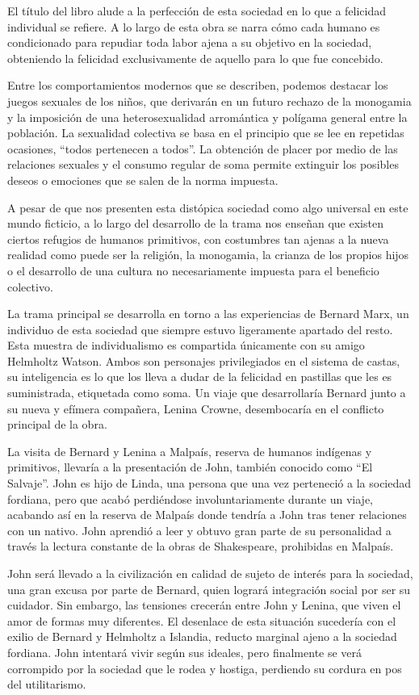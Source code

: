 \documentclass{article}
\begin{document}
El título del libro alude a la perfección de esta sociedad en lo que a felicidad individual se refiere. A lo largo de esta obra se narra cómo cada humano es condicionado para repudiar toda labor ajena a su objetivo en la sociedad, obteniendo la felicidad exclusivamente de aquello para lo que fue concebido.

Entre los comportamientos modernos que se describen, podemos destacar los juegos sexuales de los niños, que derivarán en un futuro rechazo de la monogamia y la imposición de una heterosexualidad arromántica y polígama general entre la población. La sexualidad colectiva se basa en el principio que se lee en repetidas ocasiones, ``todos pertenecen a todos''. La obtención de placer por medio de las relaciones sexuales y el consumo regular de soma permite extinguir los posibles deseos o emociones que se salen de la norma impuesta.

A pesar de que nos presenten esta distópica sociedad como algo universal en este mundo ficticio, a lo largo del desarrollo de la trama nos enseñan que existen ciertos refugios de humanos primitivos, con costumbres tan ajenas a la nueva realidad como puede ser la religión, la monogamia, la crianza de los propios hijos o el desarrollo de una cultura no necesariamente impuesta para el beneficio colectivo.

La trama principal se desarrolla en torno a las experiencias de Bernard Marx, un individuo de esta sociedad que siempre estuvo ligeramente apartado del resto. Esta muestra de individualismo es compartida únicamente con su amigo Helmholtz Watson. Ambos son personajes privilegiados en el sistema de castas, su inteligencia es lo que los lleva a dudar de la felicidad en pastillas que les es suministrada, etiquetada como soma. Un viaje que desarrollaría Bernard junto a su nueva y efímera compañera, Lenina Crowne, desembocaría en el conflicto principal de la obra.

La visita de Bernard y Lenina a Malpaís, reserva de humanos indígenas y primitivos, llevaría a la presentación de John, también conocido como ``El Salvaje''. John es hijo de Linda, una persona que una vez perteneció a la sociedad fordiana, pero que acabó perdiéndose involuntariamente durante un viaje, acabando así en la reserva de Malpaís donde tendría a John tras tener relaciones con un nativo. John aprendió a leer y obtuvo gran parte de su personalidad a través la lectura constante de la obras de Shakespeare, prohibidas en Malpaís.

John será llevado a la civilización en calidad de sujeto de interés para la sociedad, una gran excusa por parte de Bernard, quien logrará integración social por ser su cuidador. Sin embargo, las tensiones crecerán entre John y Lenina, que viven el amor de formas muy diferentes. El desenlace de esta situación sucedería con el exilio de Bernard y Helmholtz a Islandia, reducto marginal ajeno a la sociedad fordiana. John intentará vivir según sus ideales, pero finalmente se verá corrompido por la sociedad que le rodea y hostiga, perdiendo su cordura en pos del utilitarismo.
\end{document}

